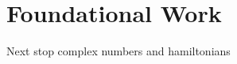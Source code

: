 \chapter{Foundational Work}
\label{chapter:Foundations}
\thispagestyle{empty}


Next stop complex numbers and hamiltonians







